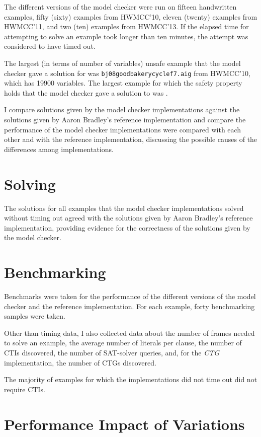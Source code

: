 \documentclass[12pt,a4paper,twoside,openright]{report}
\begin{document}
{The different versions of the model checker were run on fifteen handwritten examples,
fifty (sixty) examples from HWMCC'10, eleven (twenty) examples from HWMCC'11, and
two (ten) examples from HWMCC'13.
If the elapsed time for attempting to solve an example took longer than ten minutes, the
attempt was considered to have timed out. 

The largest (in terms of number of variables) unsafe example that the model checker gave a solution
for was \verb,bj08goodbakerycyclef7.aig, from HWMCC'10, which has 19900 variables.
The largest example for which the safety property holds that the model checker gave a solution
to was \verb,,.

I compare solutions given by the model checker implementations
against the solutions given by Aaron Bradley's reference implementation and compare
the performance of the model checker implementations were compared with each other
and with the reference implementation, discussing the possible causes of the
differences among implementations.


\section{Solving}

The solutions for all examples that the model checker implementations solved without timing out
agreed with the solutions given by Aaron Bradley's reference implementation, providing evidence
for the correctness of the solutions given by the model checker.

\section{Benchmarking}
Benchmarks were taken for the performance of the different versions of the model checker and the reference
implementation. For each example, forty benchmarking samples were taken.

Other than timing data, I also collected data about the number of frames needed to solve an example,
the average number of literals per clause, the number of CTIs discovered, the number of SAT-solver queries, and,
for the \emph{CTG} implementation, the number of CTGs discovered.

The majority of examples for which the implementations did not time out did not require
CTIs.

\section{Performance Impact of Variations}

}
\end{document}

